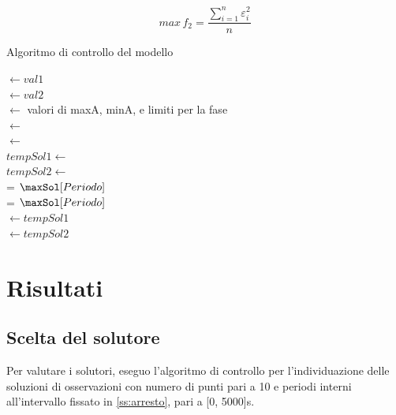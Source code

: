 \documentclass[a4paper,12pt]{report}
\begin{document}
\begin{equation}
\label{fo:maxerrore}
max \, f_2 = \frac{\sum_{i=1}^n \varepsilon_i^2}{n}
\end{equation}

\begin{algorithm}[H]
\caption{Algoritmo di controllo del modello}
\label{alg:controllo_modello}

\maxP $\leftarrow val1$ \\
\minP $\leftarrow val2$ \\
\conf $\leftarrow$ valori di maxA, minA, e limiti per la fase \\
 {
  \sol $\leftarrow$ \minInt{\data, \conf, \maxP, \minP} \\
  \maxSol $\leftarrow$ \maxInt{\data, \conf, \maxP, \minP} \\
  $tempSol1 \leftarrow$ \minInt{\data, \conf, \maxP, $\maxSol[Periodo]$} \\
  $tempSol2 \leftarrow$ \minInt{\data, \conf, $\maxSol[Periodo]$, \minP} \\
   {
    \minP =  $\maxSol[Periodo]$ \\
  } {
    \maxP = $\maxSol[Periodo]$ \\
  }
  \sol $\leftarrow tempSol1$ \\
  \sol $\leftarrow tempSol2$ \\

}

\end{algorithm}


\section{Risultati}
\label{s:risultati}

\subsection{Scelta del solutore}
\label{ss:scelta_solutore}
Per valutare i solutori, eseguo l'algoritmo di controllo per l'individuazione delle soluzioni di osservazioni con numero di punti pari a 10 e periodi interni all'intervallo fissato in \ref{ss:arresto}, pari a [0, 5000]s.
\end{document}
